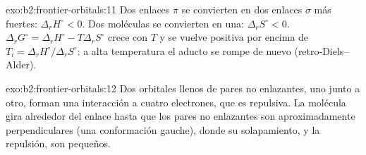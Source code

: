 \begin{solution}{exo:b2:frontier-orbitals:11}
Dos enlaces $\pi$ se convierten en dos enlaces $\sigma$ más fuertes: $\Delta_r H^\circ < 0$. Dos moléculas se convierten en una:
$\Delta_r S^\circ < 0$. $\Delta_r G^\circ = \Delta_r H^\circ - T\Delta_r S^\circ$ crece con $T$ y se vuelve
positiva por encima de $T_i = \Delta_r H^\circ/\Delta_r S^\circ$: a alta temperatura el aducto se rompe de nuevo
(retro-Diels--Alder).
\end{solution}

\begin{solution}{exo:b2:frontier-orbitals:12}
Dos orbitales llenos de pares no enlazantes, uno junto a otro, forman una interacción a cuatro electrones, que es
repulsiva. La molécula gira alrededor del enlace  hasta que los pares no enlazantes son aproximadamente
perpendiculares (una conformación gauche), donde su solapamiento, y la repulsión, son
pequeños.
\end{solution}

